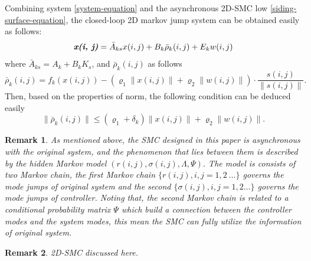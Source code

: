 \documentclass[conference]{IEEEtran}
\newtheorem{remark}{Remark}
\begin{document}
	Combining system \eqref{system-equation} and the asynchronous 2D-SMC low \eqref{siding-surface-equation}, the closed-loop 2D markov jump system can be obtained easily as follows:
	\begin{equation} \label{closed-loop-system-equation}
	\emph{\textbf{x(i, j)}} = \bar{A}_{ks}x(i,j)+B_{k}\bar{\rho}_{k}(i,j)+E_{k}w(i,j)
	\end{equation}
	where $\bar{A}_{ks} = A_{k}+B_{k}K_{s}$, and $\bar{\rho}_{k}(i,j)$ as follows
	\begin{equation*}
	\bar\rho_{k}(i,j)=f_{k}(x(i,j))-(\varrho_{1}\|x(i,j)\|+\varrho_{2}\|w(i,j)\|)\cdot\frac{s(i,j)}{\|s(i,j)\|}.
	\end{equation*}
	Then, based on the properties of norm, the following condition can be deduced easily
	\begin{equation}\label{norm-rho-inequality}
	\|\bar{\rho}_{k}(i,j)\| \leq (\varrho_{1}+\delta_{k})\|x(i,j)\| + \varrho_{2}\|w(i,j)\| .
	\end{equation} 
		
	\begin{remark}
		As mentioned above, the SMC  designed in this paper is  asynchronous with the original system, and the phenomenon that lies between them is described by the hidden Markov model $(r(i,j),\sigma(i,j),\varLambda,\varPsi)$. The model is consists of two Markov chain, the first Markov chain $\{r(i,j), i,j=1,2\ \dots\}$ governs the mode jumps of original system and the second $\{ \sigma(i,j), i,j=1,2\dots \}$ governs the mode jumps of controller. Noting that, the second Markov chain is related to a conditional probability matrix $\varPsi$ which build a connection between the controller modes and the system modes, this mean the SMC can fully utilize the information of original system.
	\end{remark}

\begin{remark}
	2D-SMC discussed here.
\end{remark}
\end{document}
